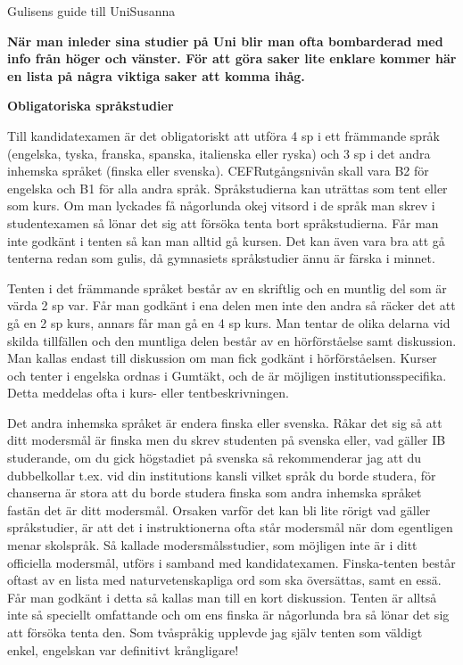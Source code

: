 \documentclass{spektraklet}
\begin{document}
\begin{artikel}{Gulisens guide till Uni}{Susanna}

\textbf{När man inleder sina studier på Uni blir man ofta bombarderad med info från höger och vänster. För att göra saker lite enklare kommer här en lista på några viktiga saker att komma ihåg.}

\textbf{Obligatoriska språkstudier}

Till kandidatexamen är det obligatoriskt att utföra 4 sp i ett främmande språk (engelska, tyska, franska, spanska, italienska eller ryska) och 3 sp i det andra inhemska språket (finska eller svenska). CEFRutgångsnivån skall vara B2 för engelska och B1 för alla andra språk. Språkstudierna kan uträttas som tent eller som kurs. 
Om man lyckades få någorlunda okej vitsord i de språk man skrev i studentexamen så lönar det sig att försöka tenta bort språkstudierna. Får man inte godkänt i tenten så kan man alltid gå kursen. Det kan även vara bra att gå tenterna redan som gulis, då gymnasiets språkstudier ännu är färska i minnet.

Tenten i det främmande språket består av en skriftlig och en muntlig del som är värda 2 sp var. Får man godkänt i ena delen men inte den andra så räcker det att gå en 2 sp kurs, annars får man gå en 4 sp kurs. Man tentar de olika delarna vid skilda tillfällen och den muntliga delen består av en hörförståelse samt diskussion. Man kallas endast till diskussion om man fick godkänt i hörförståelsen. Kurser och tenter i engelska
ordnas i Gumtäkt, och de är möjligen institutionsspecifika. Detta meddelas ofta i kurs- eller tentbeskrivningen.

Det andra inhemska språket är endera finska eller svenska. Råkar det sig så att ditt
modersmål är finska men du skrev studenten på svenska eller, vad gäller IB studerande, om du gick högstadiet på svenska så rekommenderar jag att du dubbelkollar t.ex. vid din institutions kansli vilket språk du borde studera, för chanserna är stora att du borde studera finska som andra inhemska språket fastän det är ditt modersmål. Orsaken varför det kan bli lite rörigt vad gäller språkstudier, är att det i instruktionerna ofta står modersmål när dom egentligen menar skolspråk. Så kallade modersmålsstudier, som möjligen inte är i ditt officiella modersmål, utförs i samband med kandidatexamen. 
Finska-tenten består oftast av en lista med naturvetenskapliga ord som ska översättas, samt en essä. Får man godkänt i detta så kallas man till en kort diskussion. Tenten är alltså inte så speciellt omfattande och om ens finska är någorlunda bra så lönar det sig att försöka tenta den. Som tvåspråkig upplevde jag själv tenten som väldigt enkel, engelskan var definitivt krångligare!


\end{artikel}
\end{document}
